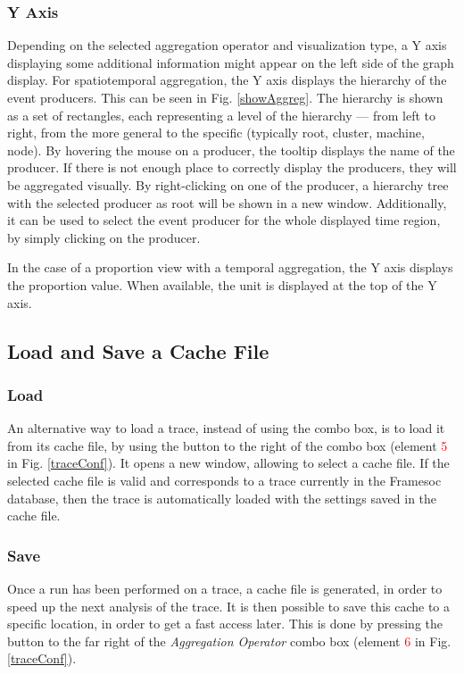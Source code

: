 \documentclass[twoside]{article}
\begin{document}
\begin{sloppypar}
\subsubsection{Y Axis}
Depending on the selected aggregation operator and visualization type, a Y axis displaying some additional information might appear on the left side of the graph display. For spatiotemporal aggregation, the Y axis displays the hierarchy of the event producers. This can be seen in Fig. \ref{showAggreg}. The hierarchy is shown as a set of rectangles, each representing a level of the hierarchy --- from left to right, from the more general to the specific (typically root, cluster, machine, node). By hovering the mouse on a producer, the tooltip displays the name of the producer. If there is not enough place to correctly display the producers, they will be aggregated visually. By right-clicking on one of the producer, a hierarchy tree with the selected producer as root will be shown in a new window. Additionally, it can be used to select the event producer for the whole displayed time region, by simply clicking on the producer.

In the case of a proportion view with a temporal aggregation, the Y axis displays the proportion value. When available, the unit is displayed at the top of the Y axis.

\subsection{Load and Save a Cache File}
\subsubsection{Load}
An alternative way to load a trace, instead of using the combo box, is to load it from its cache file, by using the button to the right of the combo box (element \textcolor{red}{5} in Fig. \ref{traceConf}). It opens a new window, allowing to select a cache file. If the selected cache file is valid and corresponds to a trace currently in the Framesoc database, then the trace is automatically loaded with the settings saved in the cache file.

\subsubsection{Save}
Once a run has been performed on a trace, a cache file is generated, in order to speed up the next analysis of the trace. It is then possible to save this cache to a specific location, in order to get a fast access later. This is done by pressing the button to the far right of the \textit{Aggregation Operator} combo box (element \textcolor{red}{6} in Fig. \ref{traceConf}).


\end{sloppypar}
\end{document}
